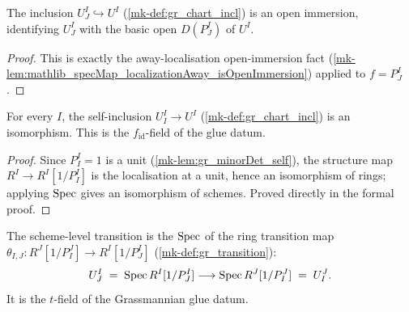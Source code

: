\begin{lemma}\label{mk-lem:gr_chartIncl_isOpenImmersion}
  \leanok

  The inclusion \(U^I_J \hookrightarrow U^I\) (\ref{mk-def:gr_chart_incl}) is an
  open immersion, identifying \(U^I_J\) with the basic open \(D(P^I_J)\) of
  \(U^I\).
\end{lemma}
\begin{proof}
  \leanok
  This is exactly the away-localisation open-immersion fact
  (\ref{mk-lem:mathlib_specMap_localizationAway_isOpenImmersion}) applied to
  \(f = P^I_J\).
\end{proof}

\begin{lemma}\label{mk-lem:gr_chartIncl_self_isIso}
  \leanok

  For every \(I\), the self-inclusion \(U^I_I \to U^I\) (\ref{mk-def:gr_chart_incl})
  is an isomorphism. This is the \(f_{\mathrm{id}}\)-field of the glue datum.
\end{lemma}
\begin{proof}
  \leanok
  Since \(P^I_I = 1\) is a unit (\ref{mk-lem:gr_minorDet_self}), the structure map
  \(R^I \to R^I[1/P^I_I]\) is the localisation at a unit, hence an isomorphism of
  rings; applying \(\operatorname{Spec}\) gives an isomorphism of schemes. Proved directly in
  the formal proof.
\end{proof}

\begin{definition}\label{mk-def:gr_chart_transition}
  \leanok

  The scheme-level transition is the \(\operatorname{Spec}\) of the ring transition map
  \(\theta_{I,J} : R^J[1/P^J_I] \to R^I[1/P^I_J]\) (\ref{mk-def:gr_transition}):
  \[
    U^I_J \;=\; \operatorname{Spec} R^I[1/P^I_J] \longrightarrow \operatorname{Spec} R^J[1/P^J_I] \;=\; U^J_I .
  \]
  It is the \(t\)-field of the Grassmannian glue datum.
\end{definition}

